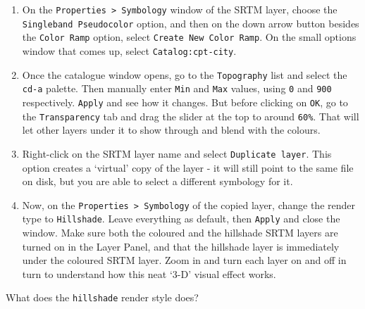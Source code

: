 \documentclass[
  letterpaper,
  DIV=11,
  numbers=noendperiod]{scrreprt}
\begin{document}
\begin{enumerate}
\def\labelenumi{(\arabic{enumi})}
\setcounter{enumi}{145}
\item
  On the \texttt{Properties\ \textgreater{}\ Symbology} window of the
  SRTM layer, choose the \texttt{Singleband\ Pseudocolor} option, and
  then on the down arrow button besides the \texttt{Color\ Ramp} option,
  select \texttt{Create\ New\ Color\ Ramp}. On the small options window
  that comes up, select \texttt{Catalog:cpt-city}.
\item
  Once the catalogue window opens, go to the \texttt{Topography} list
  and select the \texttt{cd-a} palette. Then manually enter \texttt{Min}
  and \texttt{Max} values, using \texttt{0} and \texttt{900}
  respectively. \texttt{Apply} and see how it changes. But before
  clicking on \texttt{OK}, go to the \texttt{Transparency} tab and drag
  the slider at the top to around \texttt{60\%}. That will let other
  layers under it to show through and blend with the colours.
\item
  Right-click on the SRTM layer name and select
  \texttt{Duplicate\ layer}. This option creates a `virtual' copy of the
  layer - it will still point to the same file on disk, but you are able
  to select a different symbology for it.
\item
  Now, on the \texttt{Properties\ \textgreater{}\ Symbology} of the
  copied layer, change the render type to \texttt{Hillshade}. Leave
  everything as default, then \texttt{Apply} and close the window. Make
  sure both the coloured and the hillshade SRTM layers are turned on in
  the Layer Panel, and that the hillshade layer is immediately under the
  coloured SRTM layer. Zoom in and turn each layer on and off in turn to
  understand how this neat `3-D' visual effect works.
\end{enumerate}

\begin{tcolorbox}[enhanced jigsaw, breakable, toptitle=1mm, colback=white, left=2mm, leftrule=.75mm, titlerule=0mm, colframe=quarto-callout-important-color-frame, opacityback=0, title=\textcolor{quarto-callout-important-color}{\faExclamation}\hspace{0.5em}{Stop and Think}, toprule=.15mm, opacitybacktitle=0.6, bottomtitle=1mm, colbacktitle=quarto-callout-important-color!10!white, bottomrule=.15mm, coltitle=black, rightrule=.15mm, arc=.35mm]

What does the \texttt{hillshade} render style does?

\end{tcolorbox}
\end{document}
